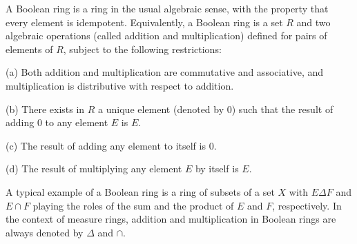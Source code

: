 A Boolean ring is a ring in the usual algebraic sense, with the property that every element is idempotent. Equivalently, a Boolean ring is a set $R$ and two algebraic operations (called addition and multiplication) defined for pairs of elements of $R$, subject to the following restrictions:

(a) Both addition and multiplication are commutative and associative, and multiplication is distributive with respect to addition.

(b) There exists in $R$ a unique element (denoted by $0$) such that the result of adding $0$ to any element $E$ is $E$.

(c) The result of adding any element to itself is $0$.

(d) The result of multiplying any element $E$ by itself is $E$.

A typical example of a Boolean ring is a ring of subsets of a set $X$ with $E \Delta F$ and $E \cap F$ playing the roles of the sum and the product of $E$ and $F$, respectively. In the context of measure rings, addition and multiplication in Boolean rings are always denoted by $\Delta$ and $\cap$.
